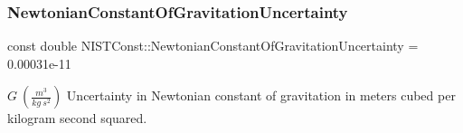 \subsubsection{\texorpdfstring{Newtonian\+Constant\+Of\+Gravitation\+Uncertainty}{NewtonianConstantOfGravitationUncertainty}}
{\footnotesize\ttfamily const double N\+I\+S\+T\+Const\+::\+Newtonian\+Constant\+Of\+Gravitation\+Uncertainty = 0.\+00031e-\/11}

$G \ (\frac{m^3}{kg\ s^2})$ Uncertainty in Newtonian constant of gravitation in meters cubed per kilogram second squared. 